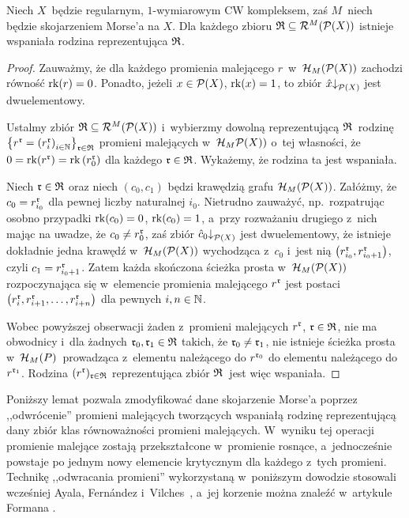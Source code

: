 \begin{lem}\label{istnieje_rodzina_wspaniala_dla_grafu}
Niech $X$~będzie regularnym, $1$-wymiarowym CW kompleksem, zaś $M$~niech będzie skojarzeniem Morse'a na $X$. Dla każdego zbioru $\mathfrak{R}\subseteq \mathcal{R}^M(\mathcal{P}(X))$ istnieje wspaniała rodzina reprezentująca $\mathfrak{R}$.
\end{lem}
\begin{proof}
Zauważmy, że dla każdego promienia malejącego $r$~w~$\mathcal{H}_{M}(\mathcal{P}(X))$ zachodzi równość $\operatorname{rk}(r)=0$. Ponadto, jeżeli $x\in \mathcal{P}(X)$, $\operatorname{rk}(x)=1$, to zbiór $\hat{x}\mathord{\downarrow}_{\mathcal{P}(X)}$ jest dwuelementowy.

Ustalmy zbiór $\mathfrak{R}\subseteq \mathcal{R}^M(\mathcal{P}(X))$ i~wybierzmy dowolną reprezentującą $\mathfrak{R}$~rodzinę $\bigl\{r^{\mathfrak{r}}=\left(r^{\mathfrak{r}}_i\right)_{i\in\mathbb{N}}\bigr\}_{\mathfrak{r}\in\mathfrak{R}}$ promieni malejących w~$\mathcal{H}_M{\mathcal{P}(X)})$ o~tej własności, że $0=\operatorname{rk}(r^{\mathfrak{r}})=\operatorname{rk}\left(r^{\mathfrak{r}}_0\right)$ dla każdego $\mathfrak{r}\in\mathfrak{R}$. Wykażemy, że rodzina ta jest wspaniała.

Niech $\mathfrak{r}\in \mathfrak{R}$ oraz niech $(c_0,c_1)$ będzi krawędzią grafu $\mathcal{H}_M(\mathcal{P}(X))$. Załóżmy, że $c_0=r^{\mathfrak{r}}_{i_0}$ dla pewnej liczby naturalnej $i_0$. Nietrudno zauważyć, np.~rozpatrując osobno przypadki $\operatorname{rk}(c_0)=0$, $\operatorname{rk}(c_0)=1$, a~przy rozważaniu drugiego z~nich mając na uwadze, że $c_0\not=r^{\mathfrak{r}}_0$, zaś zbiór $\hat{c}_0\mathord{\downarrow}_{\mathcal{P}(X)}$ jest dwuelementowy, że istnieje dokładnie jedna krawędź w~$\mathcal{H}_M(\mathcal{P}(X))$ wychodząca z~$c_0$ i~jest nią $\bigl(r^{\mathfrak{r}}_{i_0}, r^{\mathfrak{r}}_{i_0+1}\bigr)$, czyli $c_1=r^{\mathfrak{r}}_{i_0+1}$. Zatem każda skończona ścieżka prosta w~$\mathcal{H}_M(\mathcal{P}(X))$ rozpoczynająca się w~elemencie promienia malejącego $r^{\mathfrak{r}}$ jest postaci $\bigl(r^{\mathfrak{r}}_i,r^{\mathfrak{r}}_{i+1},\ldots,r^{\mathfrak{r}}_{i+n}\bigr)$ dla pewnych $i,n\in\mathbb{N}$. 

Wobec powyższej obserwacji żaden z~promieni malejących $r^{\mathfrak{r}}$, $\mathfrak{r}\in\mathfrak{R}$, nie ma obwodnicy i~dla żadnych $\mathfrak{r}_0, \mathfrak{r}_1\in\mathfrak{R}$ takich, że $\mathfrak{r}_0\not=\mathfrak{r}_1$, nie istnieje ścieżka prosta w~$\mathcal{H}_M(P)$~prowadząca z~elementu należącego do $r^{\mathfrak{r}_0}$ do elementu należącego do $r^{\mathfrak{r}_1}$. Rodzina $(r^{\mathfrak{r}})_{\mathfrak{r}\in\mathfrak{R}}$ reprezentująca zbiór $\mathfrak{R}$~jest więc wspaniała.
\end{proof}

Poniższy lemat pozwala zmodyfikować dane skojarzenie Morse'a poprzez ,,odwrócenie'' promieni malejących tworzących wspaniałą rodzinę reprezentującą dany zbiór klas równoważności promieni malejących. W~wyniku tej operacji promienie malejące zostają przekształcone w~promienie rosnące, a~jednocześnie powstaje po jednym nowy elemencie krytycznym dla każdego z~tych promieni. Technikę ,,odwracania promieni'' wykorzystaną w~poniższym dowodzie stosowali wcześniej Ayala, Fern{\'a}ndez i~Vilches~\cite{Ayala10}, a~jej korzenie można znaleźć w~artykule Formana \cite{Forman98}.

